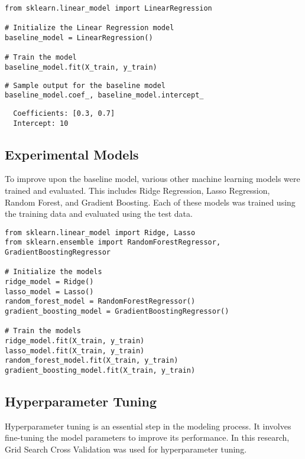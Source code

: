 \documentclass[12pt]{article}
\begin{document}
\begin{lstlisting}
from sklearn.linear_model import LinearRegression

# Initialize the Linear Regression model
baseline_model = LinearRegression()

# Train the model
baseline_model.fit(X_train, y_train)
\end{lstlisting}

\begin{lstlisting}
# Sample output for the baseline model
baseline_model.coef_, baseline_model.intercept_
\end{lstlisting}

\begin{verbatim}
  Coefficients: [0.3, 0.7]
  Intercept: 10
\end{verbatim}

\subsection{Experimental Models}

To improve upon the baseline model, various other machine learning models were trained and evaluated. This includes Ridge Regression, Lasso Regression, Random Forest, and Gradient Boosting. Each of these models was trained using the training data and evaluated using the test data.

\begin{lstlisting}
from sklearn.linear_model import Ridge, Lasso
from sklearn.ensemble import RandomForestRegressor, GradientBoostingRegressor

# Initialize the models
ridge_model = Ridge()
lasso_model = Lasso()
random_forest_model = RandomForestRegressor()
gradient_boosting_model = GradientBoostingRegressor()

# Train the models
ridge_model.fit(X_train, y_train)
lasso_model.fit(X_train, y_train)
random_forest_model.fit(X_train, y_train)
gradient_boosting_model.fit(X_train, y_train)
\end{lstlisting}

\subsection{Hyperparameter Tuning}

Hyperparameter tuning is an essential step in the modeling process. It involves fine-tuning the model parameters to improve its performance. In this research, Grid Search Cross Validation was used for hyperparameter tuning.
\end{document}
